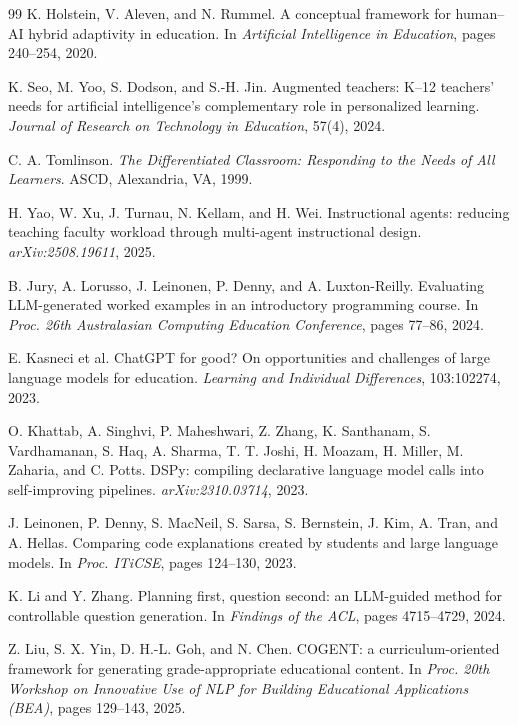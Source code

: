 \documentclass{article}
\begin{document}
\begin{thebibliography}{99}
 K. Holstein, V. Aleven, and N. Rummel. A conceptual
framework for human--AI hybrid adaptivity in education. In \emph{Artificial Intelligence in
Education}, pages 240--254, 2020.

 K. Seo, M. Yoo, S. Dodson, and S.-H. Jin. Augmented
teachers: K--12 teachers' needs for artificial intelligence's complementary role in
personalized learning. \emph{Journal of Research on Technology in Education}, 57(4), 2024.

 C. A. Tomlinson. \emph{The Differentiated Classroom:
Responding to the Needs of All Learners}. ASCD, Alexandria, VA, 1999.

 H. Yao, W. Xu, J. Turnau, N. Kellam, and
H. Wei. Instructional agents: reducing teaching faculty workload through multi-agent
instructional design. \emph{arXiv:2508.19611}, 2025.

 B. Jury, A. Lorusso, J. Leinonen, P. Denny, and
A. Luxton-Reilly. Evaluating LLM-generated worked examples in an introductory programming course.
In \emph{Proc. 26th Australasian Computing Education Conference}, pages 77--86, 2024.

 E. Kasneci et al. ChatGPT for good? On opportunities
and challenges of large language models for education. \emph{Learning and Individual
Differences}, 103:102274, 2023.

 O. Khattab, A. Singhvi, P. Maheshwari, Z. Zhang,
K. Santhanam, S. Vardhamanan, S. Haq, A. Sharma, T. T. Joshi, H. Moazam, H. Miller, M. Zaharia,
and C. Potts. DSPy: compiling declarative language model calls into self-improving pipelines.
\emph{arXiv:2310.03714}, 2023.

 J. Leinonen, P. Denny, S. MacNeil, S. Sarsa,
S. Bernstein, J. Kim, A. Tran, and A. Hellas. Comparing code explanations created by students and
large language models. In \emph{Proc. ITiCSE}, pages 124--130, 2023.

 K. Li and Y. Zhang. Planning first, question second: an
LLM-guided method for controllable question generation. In \emph{Findings of the ACL}, pages
4715--4729, 2024.

 Z. Liu, S. X. Yin, D. H.-L. Goh, and N. Chen. COGENT: a
curriculum-oriented framework for generating grade-appropriate educational content. In
\emph{Proc. 20th Workshop on Innovative Use of NLP for Building Educational Applications (BEA)},
pages 129--143, 2025.


\end{thebibliography}
\end{document}
